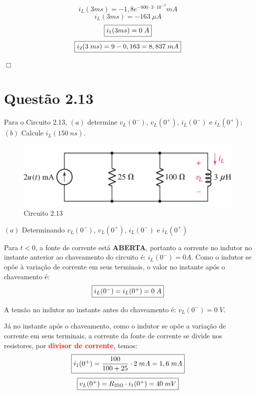 \documentclass[
	12pt,				%
	oneside,			%
	a4paper,			%
	english,			%
	french,				%
	spanish,			%
	brazil				%
	]{abntex2}
\begin{document}
$$ i_L(3 ms) = -1,8e^{-800\cdot 3 \cdot 10^{-3}}mA $$
$$i_L(3 ms) = -163 \;\mu A$$
\begin{equation}
    \fbox{$i_1(3 ms) = 0\;A$}
\end{equation}
\begin{equation}
\fbox{$i_2(3\;ms) = 9 - 0,163 = 8,837\;mA$}
\end{equation}

\begin{flushright}
    $\Box$
\end{flushright}
\newpage

\section*{Questão 2.13}
Para o Circuito 2.13, $(a)$ determine $v_L(0^-)$, $v_L(0^+)$, $i_L(0^-)$ e $i_L(0^+)$; $(b)$ Calcule $i_L(150\;ns)$.

\begin{figure}[htb]
	\centering
	\includegraphics[scale=0.5]{2-13.PNG}
	\caption{Circuito 2.13}
\end{figure}
$(a)$ Determinando $v_L(0^-)$, $v_L(0^+)$, $i_L(0^-)$ e $i_L(0^+)$

Para $t < 0$, a fonte de corrente está \textbf{ABERTA}, portanto a corrente no indutor no instante anterior ao chaveamento do circuito é: $i_L(0^-)=0A$. Como o indutor se opõe à variação de corrente em seus terminais, o valor no instante após o chaveamento é: 
\begin{equation}
    \centering
    \fbox{$i_L(0^-)=i_L(0^+)=0\;A$}
\end{equation}

A tensão no indutor no instante antes do chaveamento é: $v_L{(0^-)} = 0\;V$.

Já no instante após o chaveamento, como o indutor se opõe a variação de corrente em seus terminais, a corrente da fonte de corrente se divide nos resistores, por \textbf{\textcolor{red}{divisor de corrente}}, temos:
\begin{equation}
    \centering
    \fbox{$i_1(0^+) = \dfrac{100}{100 + 25} \cdot 2\;mA = 1,6\;mA$}
\end{equation}
\begin{equation}
    \centering
    \fbox{$v_L(0^+) = R_{25 \Omega} \cdot i_1(0^+) = 40\;mV$}
\end{equation}
\end{document}
